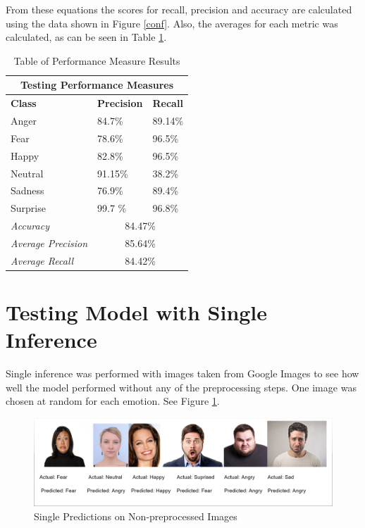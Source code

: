 From these equations the scores for recall, precision and accuracy are calculated using the data shown in Figure \ref{conf}. Also, the averages for each metric was calculated, as can be seen in Table \ref{table:per}.
\begin{table}[ht]
	\begin{center}
	\begin{tabular}{|p{5cm}||p{2cm}||p{2cm}|}		
		\hline
		
		\multicolumn{3}{|c|}{Testing Performance Measures} \\
		\hline
		\textbf{Class}& \textbf{Precision} &  \textbf{Recall}\\
		\hline
		Anger  & 84.7\% & 89.14\%	\\
		\hline
		Fear  & 78.6\% & 96.5\%	\\
		\hline
		Happy  & 82.8\% & 96.5\%  \\
		\hline
		Neutral & 91.15\% & 38.2\%	\\
		\hline	
		Sadness &  76.9\% & 89.4\%	\\
		\hline
		Surprise & 99.7 \% & 96.8\%	\\
		\hline	
		\hline 
		\textit{Accuracy} & \multicolumn{2}{|c|}{ 84.47\%} \\
		\hline
		\textit{Average Precision} & \multicolumn{2}{|c|}{ 85.64\%} \\
		\hline
		\textit{Average Recall} & \multicolumn{2}{|c|}{ 84.42\%} \\
		\hline
	\end{tabular}
	\caption{Table of Performance Measure Results}
	\label{table:per}
	\end{center}
\end{table}
	
\section{Testing Model with Single Inference}
Single inference was performed with images taken from Google Images to see how well the model performed without any of the preprocessing steps. One image was chosen at random for each emotion. See Figure \ref{inf}.

\begin{figure}[ht]
	\begin{center}
		\advance\leftskip-3cm
		\advance\rightskip-3cm
		\includegraphics[keepaspectratio=true,scale=0.22]{__resources/Testing/inference.png}
		\caption{Single Predictions on Non-preprocessed Images}
		\label{inf}
	\end{center}
\end{figure}


